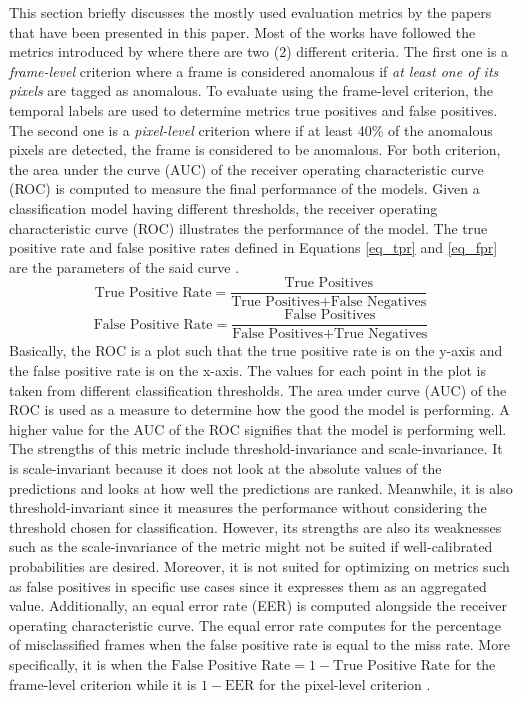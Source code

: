 This section briefly discusses the mostly used evaluation metrics by the papers that have been presented in this paper. Most of the works have followed the metrics introduced by  where there are two (2) different criteria. The first one is a \textit{frame-level} criterion where a frame is considered anomalous if \textit{at least one of its pixels} are tagged as anomalous. To evaluate using the frame-level criterion, the temporal labels are used to determine metrics true positives and false positives. The second one is a \textit{pixel-level} criterion where if at least 40\% of the anomalous pixels are detected, the frame is considered to be anomalous. For both criterion, the area under the curve (AUC) of the receiver operating characteristic curve (ROC) is computed to measure the final performance of the models. Given a classification model having different thresholds, the receiver operating characteristic curve (ROC) illustrates the performance of the model. The true positive rate and false positive rates defined in Equations \ref{eq_tpr} and \ref{eq_fpr} are the parameters of the said curve . 
\begin{equation}\label{eq_tpr}
    \mbox{True Positive Rate} = \frac{\mbox{True Positives}}{\mbox{True Positives} + \mbox{False Negatives}}
\end{equation}
\begin{equation}\label{eq_fpr}
    \mbox{False Positive Rate} = \frac{\mbox{False Positives}}{\mbox{False Positives} + \mbox{True Negatives}}
\end{equation}
Basically, the ROC is a plot such that the true positive rate is on the y-axis and the false positive rate is on the x-axis. The values for each point in the plot is taken from different classification thresholds. The area under curve (AUC) of the ROC is used as a measure to determine how the good the model is performing. A higher value for the AUC of the ROC signifies that the model is performing well. The strengths of this metric include threshold-invariance and scale-invariance. It is scale-invariant because it does not look at the absolute values of the predictions and looks at how well the predictions are ranked. Meanwhile, it is also threshold-invariant since it measures the performance without considering the threshold chosen for classification. However, its strengths are also its weaknesses such as the scale-invariance of the metric might not be suited if well-calibrated probabilities are desired. Moreover, it is not suited for optimizing on metrics such as false positives in specific use cases since it expresses them as an aggregated value. Additionally, an equal error rate (EER) is computed alongside the receiver operating characteristic curve. The equal error rate computes for the percentage of misclassified frames when the false positive rate is equal to the miss rate. More specifically, it is when the $\mbox{False Positive Rate} = 1 - \mbox{True Positive Rate}$ for the frame-level criterion while it is $1 - \mbox{EER}$ for the pixel-level criterion .
